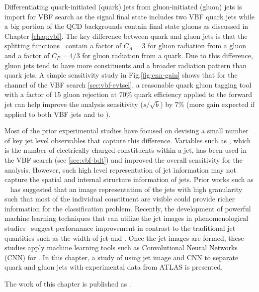 Differentiating quark-initiated (quark) jets from gluon-initiated (gluon) jets is import for VBF \Hbb search as the signal final state includes two VBF quark jets while a big portion of the QCD backgrounds contain final state gluons as discussed in Chapter \ref{chap:vbf}. The key difference between quark and gluon jets is that the splitting functions~\cite{Altarelli:1977zs} contain a factor of $C_A=3$ for gluon radiation from a gluon and a factor of $C_F=4/3$ for gluon radiation from a quark. Due to this difference, gluon jets tend to have more constituents and a broader radiation pattern than quark jets. A simple sensitivity study in Fig.\ref{fig:cnn-gain} shows that for the \twocentral channel of the VBF \Hbb search \ref{sec:vbf-evtsel}, a reasonable quark gluon tagging tool with a factor of 15 gluon rejection at 70\% quark efficiency applied to the forward jet can help improve the analysis sensitivity ($s/\sqrt{b}$) by $7\%$ (more gain expected if applied to both VBF jets and to \fourcentral).

Most of the prior experimental studies have focused on devising a small number of key jet level observables that capture this difference. Variables such as \ntrk, which is the number of electrically charged constituents within a jet, has been used in the VBF \Hbb search (see \ref{sec:vbf-bdt}) and improved the overall sensitivity for the analysis. However, such high level representation of jet information may not capture the spatial and internal structure information of jets. Prior works such as ~\cite{deOliveira:2015xxd} has suggested that an image representation of the jets with high granularity such that most of the individual constituent are visible could provide richer information for the classification problem. Recently, the development of powerful machine learning techniques that can utilize the jet images in phenomenological studies~\cite{Komiske:2016rsd,Dery:2017fap} suggest \qgtagging performance improvement in contrast to the traditional jet quantities such as the width of jet and \ntrk. Once the jet images are formed, these studies apply machine learning tools such as Convolutional Neural Networks (CNN) for \qgtagging. In this chapter, a study of using jet image and CNN to separate quark and gluon jets with experimental data from ATLAS is presented.

The work of this chapter is published as \cite{ATL-PHYS-PUB-2017-017}. 


